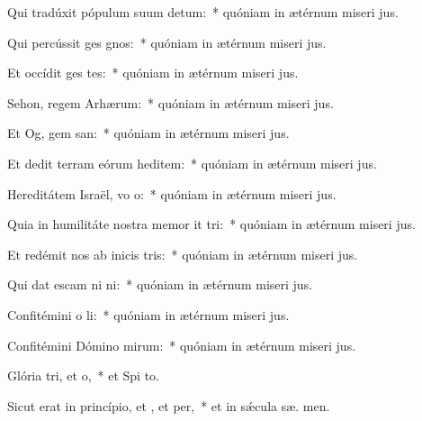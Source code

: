 \item Qui tradúxit pópulum suum  detum:~* quóniam in ætérnum miseri jus.
\item Qui percússit ges gnos:~* quóniam in ætérnum miseri jus.
\item Et occídit ges tes:~* quóniam in ætérnum miseri jus.
\item Sehon, regem Arhærum:~* quóniam in ætérnum miseri jus.
\item Et Og, gem san:~* quóniam in ætérnum miseri jus.
\item Et dedit terram eórum heditem:~* quóniam in ætérnum miseri jus.
\item Hereditátem Israël, vo o:~* quóniam in ætérnum miseri jus.
\item Quia in humilitáte nostra memor it tri:~* quóniam in ætérnum miseri jus.
\item Et redémit nos ab inicis tris:~* quóniam in ætérnum miseri jus.
\item Qui dat escam ni ni:~* quóniam in ætérnum miseri jus.
\item Confitémini o li:~* quóniam in ætérnum miseri jus.
\item Confitémini Dómino mirum:~* quóniam in ætérnum miseri jus.
\item Glória tri, et o,~* et Spi to.
\item Sicut erat in princípio, et , et per,~* et in sǽcula sæ. men.
